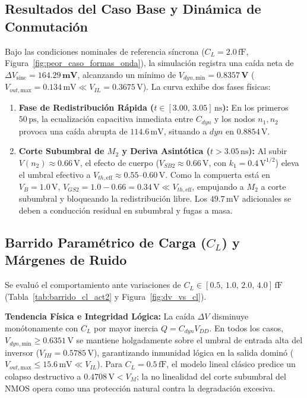 \subsection{Resultados del Caso Base y Dinámica de Conmutación}
Bajo las condiciones nominales de referencia síncrona ($C_L = 2.0\,\text{fF}$, Figura~\ref{fig:peor_caso_formas_onda}), la simulación registra una caída neta de $\Delta V_{\text{sinc}} = \mathbf{164.29\,\text{mV}}$, alcanzando un mínimo de $V_{dyn,\text{min}} = \mathbf{0.8357\,\text{V}}$ ($V_{out,\text{max}} = 0.134\,\text{mV} \ll V_{IL} = 0.3675\,\text{V}$). La curva exhibe dos fases físicas:
\begin{enumerate}[leftmargin=1.4em,itemsep=0.12em]
  \item \textbf{Fase de Redistribución Rápida ($t \in [3.00,\, 3.05]\,\text{ns}$):} En los primeros $50\,\text{ps}$, la ecualización capacitiva inmediata entre $C_{dyn}$ y los nodos $n_1, n_2$ provoca una caída abrupta de $114.6\,\text{mV}$, situando a $dyn$ en $0.8854\,\text{V}$.
  \item \textbf{Corte Subumbral de $M_2$ y Deriva Asintótica ($t > 3.05\,\text{ns}$):} Al subir $V(n_2) \approx 0.66\,\text{V}$, el efecto de cuerpo ($V_{SB2} \approx 0.66\,\text{V}$, con $k_1 = 0.4\,\text{V}^{1/2}$) eleva el umbral efectivo a $V_{th,\text{eff}} \approx 0.55\text{--}0.60\,\text{V}$. Como la compuerta está en $V_B = 1.0\,\text{V}$, $V_{GS2} = 1.0 - 0.66 = 0.34\,\text{V} \ll V_{th,\text{eff}}$, empujando a $M_2$ a corte subumbral y bloqueando la redistribución libre. Los $49.7\,\text{mV}$ adicionales se deben a conducción residual en subumbral y fugas a masa.
\end{enumerate}

\subsection{Barrido Paramétrico de Carga (\texorpdfstring{$C_L$}{CL}) y Márgenes de Ruido}
Se evaluó el comportamiento ante variaciones de $C_L \in [0.5,\, 1.0,\, 2.0,\, 4.0]\,\text{fF}$ (Tabla~\ref{tab:barrido_cl_act2} y Figura~\ref{fig:dv_vs_cl}).



\noindent\textbf{Tendencia Física e Integridad Lógica:} La caída $\Delta V$ disminuye monótonamente con $C_L$ por mayor inercia $Q = C_{dyn} V_{DD}$. En todos los casos, $V_{dyn,\text{min}} \ge 0.6351\,\text{V}$ se mantiene holgadamente sobre el umbral de entrada alta del inversor ($V_{IH} = 0.5785\,\text{V}$), garantizando inmunidad lógica en la salida dominó ($V_{out,\text{max}} \le 15.6\,\text{mV} \ll V_{IL}$). Para $C_L = 0.5\,\text{fF}$, el modelo lineal clásico predice un colapso destructivo a $0.4708\,\text{V} < V_M$; la no linealidad del corte subumbral del NMOS opera como una protección natural contra la degradación excesiva.

